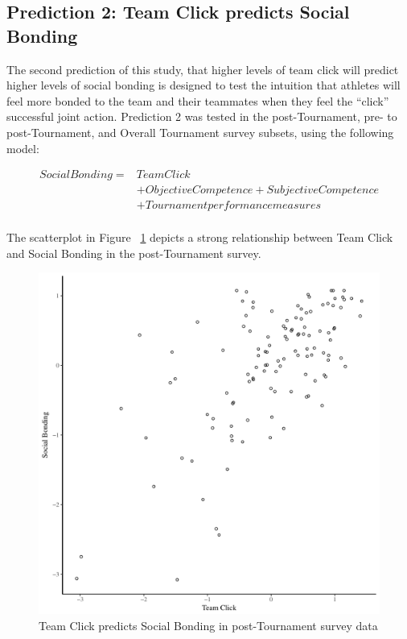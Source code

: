 \begin{landscape}
\subsection{Prediction 2: Team Click predicts Social Bonding}
The second prediction of this study, that higher levels of team click will predict higher levels of social bonding is designed to test the intuition that athletes will feel more bonded to the team and their teammates when they feel the ``click'' successful joint action.  Prediction 2 was tested in the post-Tournament, pre- to post-Tournament, and Overall Tournament survey subsets, using the following model:

  \begin{equation}
    \begin{align*}
      Social Bonding   =& Team Click\\
                      &+ Objective Competence + Subjective Competence  \\
                      &+ Tournament performance measures \\
    \end{align*}
  \end{equation}
  \bigskip

The scatterplot in Figure ~\ref{fig:clickBondBasicXY} depicts a strong relationship between Team Click and Social Bonding in the post-Tournament survey.

\begin{figure}[htbp]
\includegraphics[width = \linewidth]{images/clickBondBasicXY.pdf}
  \caption{Team Click predicts Social Bonding in post-Tournament survey data}
  \label{fig:clickBondBasicXY}
\end{figure}


\end{landscape}
